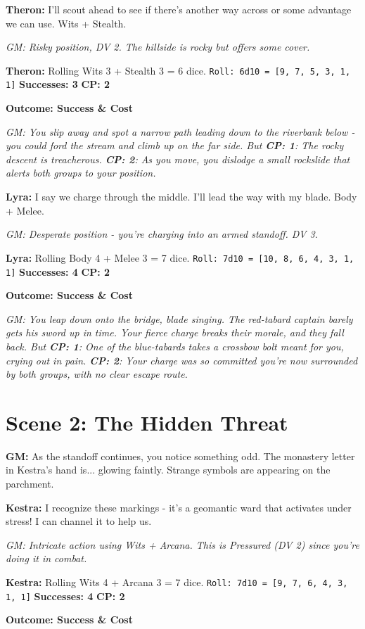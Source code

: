 \documentclass[11pt]{article}
\newcommand{\player}[1]{\textbf{#1:}}
\newcommand{\gm}[1]{\textit{GM: #1}}
\newcommand{\roll}[2]{\texttt{Roll: #1d10 = [#2]}}
\newcommand{\success}[1]{\textbf{Successes: #1}}
\newcommand{\cp}[1]{\textbf{CP: #1}}
\newcommand{\outcome}[1]{\textbf{Outcome: #1}}
\begin{document}
\player{Theron} I'll scout ahead to see if there's another way across or some advantage we can use. Wits + Stealth.

\gm{Risky position, DV 2. The hillside is rocky but offers some cover.}

\player{Theron} Rolling Wits 3 + Stealth 3 = 6 dice. \roll{6}{9, 7, 5, 3, 1, 1} \success{3} \cp{2}

\outcome{Success \& Cost}

\gm{You slip away and spot a narrow path leading down to the riverbank below - you could ford the stream and climb up on the far side. But \cp{1}: The rocky descent is treacherous. \cp{2}: As you move, you dislodge a small rockslide that alerts both groups to your position.}

\player{Lyra} I say we charge through the middle. I'll lead the way with my blade. Body + Melee.

\gm{Desperate position - you're charging into an armed standoff. DV 3.}

\player{Lyra} Rolling Body 4 + Melee 3 = 7 dice. \roll{7}{10, 8, 6, 4, 3, 1, 1} \success{4} \cp{2}

\outcome{Success \& Cost}

\gm{You leap down onto the bridge, blade singing. The red-tabard captain barely gets his sword up in time. Your fierce charge breaks their morale, and they fall back. But \cp{1}: One of the blue-tabards takes a crossbow bolt meant for you, crying out in pain. \cp{2}: Your charge was so committed you're now surrounded by both groups, with no clear escape route.}

\section*{Scene 2: The Hidden Threat}

\player{GM} As the standoff continues, you notice something odd. The monastery letter in Kestra's hand is... glowing faintly. Strange symbols are appearing on the parchment.

\player{Kestra} I recognize these markings - it's a geomantic ward that activates under stress! I can channel it to help us.

\gm{Intricate action using Wits + Arcana. This is Pressured (DV 2) since you're doing it in combat.}

\player{Kestra} Rolling Wits 4 + Arcana 3 = 7 dice. \roll{7}{9, 7, 6, 4, 3, 1, 1} \success{4} \cp{2}

\outcome{Success \& Cost}
\end{document}

